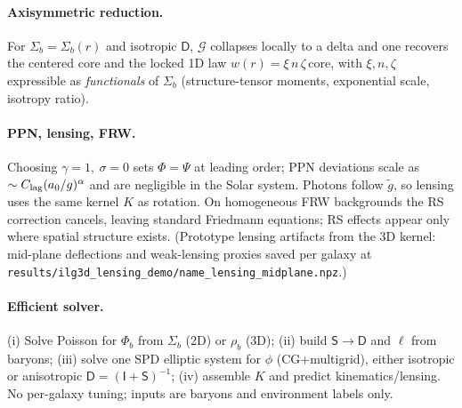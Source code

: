 \documentclass[fleqn,usenatbib]{mnras}
\begin{document}
\paragraph{Axisymmetric reduction.} For $\Sigma_b=\Sigma_b(r)$ and isotropic $\mathsf D$, $\mathcal G$ collapses locally to a delta and one recovers the centered core and the locked 1D law $w(r)=\xi\,n\,\zeta\,\mathrm{core}$, with $\xi, n, \zeta$ expressible as \emph{functionals} of $\Sigma_b$ (structure-tensor moments, exponential scale, isotropy ratio).

\paragraph{PPN, lensing, FRW.} Choosing $\gamma=1,\ \sigma=0$ sets $\Phi=\Psi$ at leading order; PPN deviations scale as $\sim C_{\rm lag}(a_0/g)^\alpha$ and are negligible in the Solar system. Photons follow $\tilde g$, so lensing uses the same kernel $K$ as rotation. On homogeneous FRW backgrounds the RS correction cancels, leaving standard Friedmann equations; RS effects appear only where spatial structure exists. (Prototype lensing artifacts from the 3D kernel: mid-plane deflections and weak-lensing proxies saved per galaxy at \texttt{results/ilg3d\_lensing\_demo/\<name\>\_lensing\_midplane.npz}.)

\paragraph{Efficient solver.} (i) Solve Poisson for $\Phi_b$ from $\Sigma_b$ (2D) or $\rho_b$ (3D); (ii) build $\mathsf S\!\to\!\mathsf D$ and $\ell$ from baryons; (iii) solve one SPD elliptic system for $\phi$ (CG+multigrid), either isotropic or anisotropic $\mathsf D=(\mathsf I+\mathsf S)^{-1}$; (iv) assemble $K$ and predict kinematics/lensing. No per-galaxy tuning; inputs are baryons and environment labels only.
\end{document}
